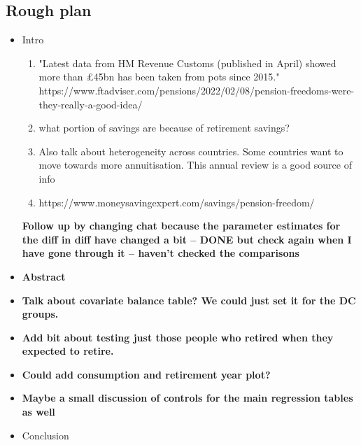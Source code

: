 \documentclass[12pt]{article}
\begin{document}
\subsection{Rough plan}
\begin{itemize}
    \item Intro
          \begin{enumerate}
              \item "Latest data from HM Revenue Customs (published in April)
                    showed more than £45bn has been taken from pots since 2015."
                    https://www.ftadviser.com/pensions/2022/02/08/pension-freedoms-were-they-really-a-good-idea/
              \item what portion of savings are because of retirement savings?
              \item Also talk about heterogeneity across countries. Some
                    countries want to move towards more annuitisation. This
                    annual review is a good source of info
                    \cite{banks_crawford_ar_2022}
              \item https://www.moneysavingexpert.com/savings/pension-freedom/
          \end{enumerate}

          \textbf{Follow up by changing chat because the parameter estimates for
              the diff in diff have changed a bit -- DONE but check again when I
              have gone through it -- haven't checked the comparisons }


    \item \textbf{Abstract}
    \item \textbf{Talk about covariate balance table? We could just set it for
              the DC groups. }
    \item \textbf{Add bit about testing just those people who retired when they
              expected to retire.}
    \item \textbf{Could add consumption and retirement year plot?}
    \item \textbf{Maybe a small discussion of controls for the main regression
              tables as well}
    \item Conclusion
\end{itemize}





\end{document}
